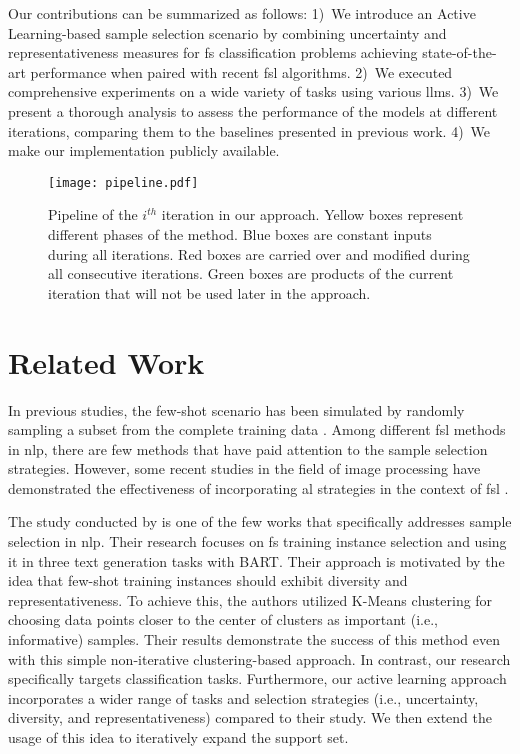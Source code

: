\documentclass[11pt]{article}
\theoremstyle{definition}
\begin{document}
Our contributions can be summarized as follows: 1)~We introduce an Active Learning-based sample selection scenario by combining uncertainty and representativeness measures for \gls*{fs} classification problems achieving state-of-the-art performance when paired with recent \gls*{fsl} algorithms.
2)~We executed comprehensive experiments on a wide variety of tasks using various \gls*{llm}s.
3)~We present a thorough analysis to assess the performance of the models at different iterations, comparing them to the baselines presented in previous work.
4)~We make our implementation publicly available.

\begin{figure*} [htb]
    \centering
	\texttt{[image: pipeline.pdf]}
	\caption{Pipeline of the $i^{th}$ iteration in our approach. Yellow boxes represent different phases of the method. Blue boxes are constant inputs during all iterations. Red boxes are carried over and modified during all consecutive iterations. Green boxes are products of the current iteration that will not be used later in the approach.}
	\label{fig:pipeline}
\end{figure*}

\section{Related Work} \label{sec:rel_work_section}

In previous studies, the few-shot scenario has been simulated by randomly sampling a subset from the complete training data \cite{chen-etal-2020-shot, schick2021few, gao-etal-2021-making, chen-etal-2021-revisiting, lin2022few, edwards-camacho-collados-2024-language}. Among different \gls*{fsl} methods in \gls*{nlp}, there are few methods that have paid attention to the sample selection strategies.
However, some recent studies in the field of image processing have demonstrated the effectiveness of incorporating \gls*{al} strategies in the context of \gls*{fsl} \cite{boney2019active, pezeshkpour2020utility, li2021alpn, shin2022active}.

The study conducted by \citet{chang2021training} is one of the few works that specifically addresses sample selection in \gls*{nlp}.
Their research focuses on \gls*{fs} training instance selection and using it in three text generation tasks with BART.
Their approach is motivated by the idea that few-shot training instances should exhibit diversity and representativeness. To achieve this, the authors utilized K-Means clustering for choosing data points closer to the center of clusters as important (i.e., informative) samples. Their results demonstrate the success of this method even with this simple non-iterative clustering-based approach. 
In contrast, our research specifically targets classification tasks. Furthermore, our active learning approach incorporates a wider range of tasks and selection strategies (i.e., uncertainty, diversity, and representativeness) compared to their study. We then extend the usage of this idea to iteratively expand the support set.
\end{document}
